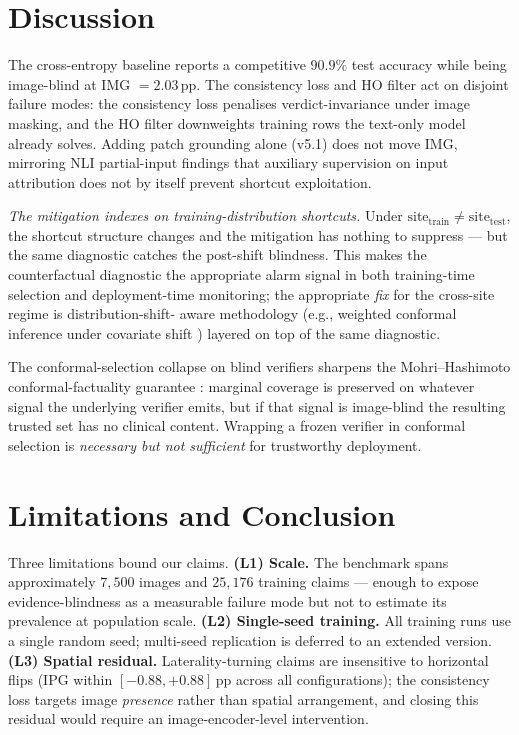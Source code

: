\documentclass{article}
\begin{document}
\section{Discussion}
\label{sec:discussion}

The cross-entropy baseline reports a competitive $90.9\%$ test accuracy
while being image-blind at IMG $= 2.03$\,pp. The consistency loss and HO
filter act on disjoint failure modes: the consistency loss penalises
verdict-invariance under image masking, and the HO filter downweights
training rows the text-only model already solves. Adding patch
grounding alone (v5.1) does not move IMG, mirroring NLI partial-input
findings \citep{gururangan2018annotation, poliak2018hypothesis} that
auxiliary supervision on input attribution does not by itself prevent
shortcut exploitation.

\emph{The mitigation indexes on training-distribution shortcuts.} Under
$\mathrm{site}_{\mathrm{train}} \neq \mathrm{site}_{\mathrm{test}}$, the
shortcut structure changes and the mitigation has nothing to suppress
--- but the same diagnostic catches the post-shift blindness. This
makes the counterfactual diagnostic the appropriate alarm signal in
both training-time selection and deployment-time monitoring; the
appropriate \emph{fix} for the cross-site regime is distribution-shift-
aware methodology (e.g., weighted conformal inference under covariate
shift \citep{tibshirani2019conformal}) layered on top of the same
diagnostic.

The conformal-selection collapse on blind verifiers sharpens the
Mohri--Hashimoto conformal-factuality guarantee
\citep{mohri2024conformal}: marginal coverage is preserved on whatever
signal the underlying verifier emits, but if that signal is image-blind
the resulting trusted set has no clinical content. Wrapping a frozen
verifier in conformal selection is \emph{necessary but not sufficient}
for trustworthy deployment.

\section{Limitations and Conclusion}
\label{sec:limits}

Three limitations bound our claims. \textbf{(L1) Scale.} The benchmark
spans approximately $7{,}500$ images and $25{,}176$ training claims ---
enough to expose evidence-blindness as a measurable failure mode but
not to estimate its prevalence at population scale. \textbf{(L2)
Single-seed training.} All training runs use a single random seed;
multi-seed replication is deferred to an extended version. \textbf{(L3)
Spatial residual.} Laterality-turning claims are insensitive to
horizontal flips (IPG within $[-0.88, +0.88]$\,pp across all
configurations); the consistency loss targets image \emph{presence}
rather than spatial arrangement, and closing this residual would
require an image-encoder-level intervention.
\end{document}
